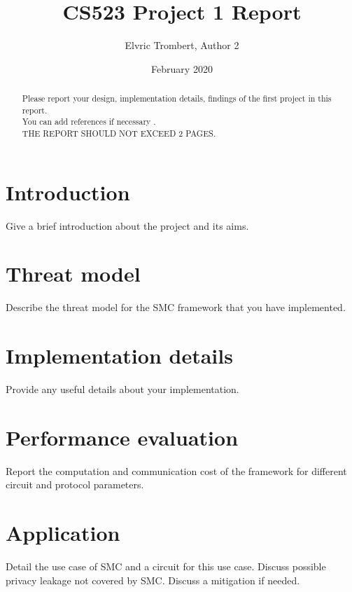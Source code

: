 \documentclass[10pt,conference,compsocconf]{IEEEtran}
\title{CS523 Project 1 Report}
\author{Elvric Trombert, Author 2}
\date{February 2020}
\begin{document}
\maketitle

\begin{abstract}
    Please report your design, implementation details, findings of the first project in this report. \\
    You can add references if necessary \cite{article}. \\
    THE REPORT SHOULD NOT EXCEED 2 PAGES.
\end{abstract}

\section{Introduction}
Give a brief introduction about the project and its aims.

\section{Threat model}
Describe the threat model for the SMC framework that you have implemented.

\section{Implementation details}
Provide any useful details about your implementation.

\section{Performance evaluation}
Report the computation and communication cost of the framework for different circuit and protocol parameters.

\section{Application}
Detail the use case of SMC and a circuit for this use case. Discuss possible privacy leakage not
covered by SMC. Discuss a mitigation if needed.



\end{document}
